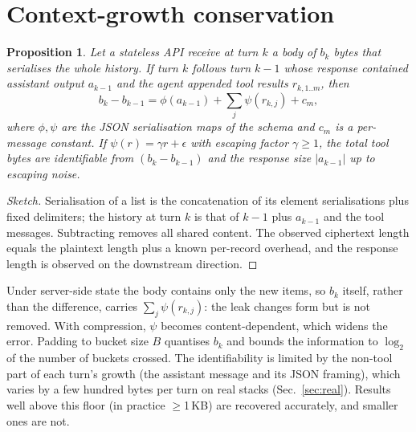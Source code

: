 \documentclass[journal]{IEEEtran}
\newtheorem{proposition}{Proposition}
\begin{document}
\section{Context-growth conservation}
\begin{proposition}\label{prop:cons}
Let a stateless API receive at turn $k$ a body of $b_k$ bytes that serialises the whole history. If turn $k$ follows turn $k-1$ whose response contained assistant output $a_{k-1}$ and the agent appended tool results $r_{k,1..m}$, then
\begin{equation}
b_k - b_{k-1} = \phi(a_{k-1}) + \textstyle\sum_j \psi(r_{k,j}) + c_m ,
\end{equation}
where $\phi,\psi$ are the JSON serialisation maps of the schema and $c_m$ is a per-message constant. If $\psi(r) = \gamma r + \epsilon$ with escaping factor $\gamma \geq 1$, the total tool bytes are identifiable from $(b_k - b_{k-1})$ and the response size $|a_{k-1}|$ up to escaping noise.
\end{proposition}
\begin{proof}[Sketch]
Serialisation of a list is the concatenation of its element serialisations plus fixed delimiters; the history at turn $k$ is that of $k-1$ plus $a_{k-1}$ and the tool messages. Subtracting removes all shared content. The observed ciphertext length equals the plaintext length plus a known per-record overhead, and the response length is observed on the downstream direction.
\end{proof}
Under server-side state the body contains only the new items, so $b_k$ itself, rather than the difference, carries $\sum_j \psi(r_{k,j})$: the leak changes form but is not removed. With compression, $\psi$ becomes content-dependent, which widens the error. Padding to bucket size $B$ quantises $b_k$ and bounds the information to $\log_2$ of the number of buckets crossed. The identifiability is limited by the non-tool part of each turn's growth (the assistant message and its JSON framing), which varies by a few hundred bytes per turn on real stacks (Sec.~\ref{sec:real}). Results well above this floor (in practice $\geq$1\,KB) are recovered accurately, and smaller ones are not.
\end{document}
